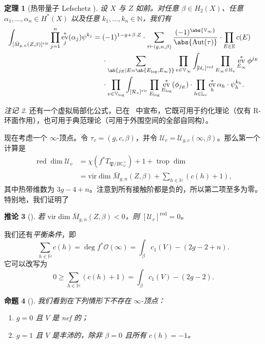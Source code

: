 \documentclass{amsart}
\newtheorem{thm}{定理}[section]
\newtheorem{cor}[thm]{推论}
\newtheorem{prop}[thm]{命题}
\theoremstyle{definition}
\theoremstyle{remark}
\newtheorem{rmk}[thm]{注记}
\theoremstyle{plain}
\theoremstyle{definition}
\theoremstyle{remark}
\newcommand{\N}{\mathbb{N}}
\newcommand{\C}{\mathbb{C}}
\newcommand{\E}{\mathbb{E}}
\newcommand{\V}{\mathbb{V}}
\renewcommand{\H}{\mathbb{H}}
\renewcommand{\L}{\mathbb{L}}
\newcommand{\mc}[1]{\mathcal{#1}}
\newcommand{\mf}[1]{\mathfrak{#1}}
\newcommand{\mr}[1]{\mathrm{#1}}
\newcommand{\on}[1]{\operatorname{#1}}
\newcommand{\1}{\mathbf{1}}
\newcommand{\2}{\mathbf{2}}
\newcommand{\3}{\mathbf{3}}
\newcommand{\vir}{\mr{vir}}
\DeclareMathOperator{\Aut}{Aut}
\DeclareMathOperator{\ev}{ev}
\begin{document}
\begin{thm}[热带量子 Lefschetz {\cite{CJRtropical2025}}]
    设 \(X\) 与 \(Z\) 如前。对任意 \(\beta \in H_2(X)\)、任意 \(\alpha_1, \ldots, \alpha_n \in H^*(X)\) 以及任意 \(k_1, \ldots, k_n \in \N\)，我们有
    \begin{align*}
        \int_{[\bar{M}_{g,n}(Z,\beta)]^{\vir}} \prod_{j=1}^n \ev_j^* (\alpha_j) \psi^{k_j}={}& (-1)^{1-g+\beta \cdot Z} \cdot \sum_{\tau \vdash (g,n,\beta)} \frac{(-1)^{\abs{\V_{\infty}}}}{\abs{\Aut(\tau)}} \cdot \prod_{E \in \E} c(E) \\
        & \cdot \sum_{\ab\{j_E \mid E = \ab\{E_{\log}, E_{\infty}\}\}}  \prod_{v \in \V_{\infty}} \int_{[\mc{U}_v]^{\on{red}}} \prod_{E_{\infty} \in \H_v} \ev_{E_{\infty}}^* \phi^{j_E}  \\
        &  \cdot \prod_{v \in \V_{\log}} \int_{[\mc{R}_v]^{\vir}} \prod_{E_{\log}} \ev_{E_{\log}}^* (\phi_{j_E}) \cdot \prod_{h \in \L_v} \ev_h^* \alpha_h \cdot \psi_h^{k_h} .
    \end{align*}
\end{thm}

\begin{rmk}
    还有一个虚拟局部化公式，已在~\cite{CJRlocalization} 中宣布，它既可用于约化理论（仅有 R-环面作用），也可用于典范理论（可用于外围空间的全部自同构）。
\end{rmk}

现在考虑一个 \(\infty\)-顶点。令 \(\tau_v = (g, c, \beta)\)，并令 \(\mc{U}_v = \mc{U}_{g,c}(\infty, \beta)\)。那么第一个计算是
\begin{align*}
    \on{red}\dim \mc{U}_v &= \chi(f^* T_{\mf{P}/B \C^{\times}_{\omega}}) + 1 + \on{trop}\dim  \\
    &= \vir\dim \bar{M}_{g,n}(Z, \beta) + \sum_{h \in \H } (c(h) + 1),
\end{align*}
其中热带维数为 \(3g-4+n\)。注意到所有接触阶都是负的，所以第二项至多为零。特别地，我们证明了
\begin{cor}[{\cite{CJRpunctured}}]
    若 \(\vir\dim \bar{M}_{g,n}(Z,\beta) < 0\)，则 \([\mc{U}_v]^{\on{red}} = 0\)。
\end{cor}
我们还有\textit{平衡条件}，即
\begin{equation}\label{eqn:balancing condition}
    \sum_{h \in \H} c(h) = \deg f^* \mc{O}(\infty) = \int_{\beta} c_1(V) - (2g-2+n).
\end{equation}
它可以改写为
\[ 0 \geq \sum_{h \in \H} (c(h)+1) = \int_{\beta} c_1(V) - (2g-2). \]
\begin{prop}[{\cite{CJRpunctured}}]
    我们看到在下列情形下不存在 \(\infty\)-顶点：
    \begin{enumerate}
        \item \(g = 0\) 且 \(V\) 是 nef 的；
        \item \(g=1\) 且 \(V\) 是丰沛的，除非 \(\beta = 0\) 且所有 \(c(h) = -1\)。
    \end{enumerate}
\end{prop}
\end{document}

